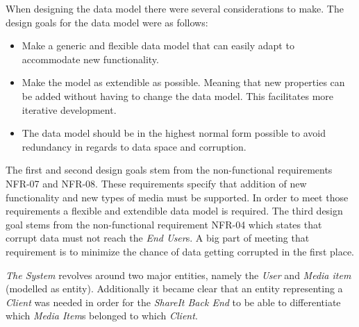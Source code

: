 \documentclass[../report.tex]{subfiles}
\begin{document}
\graphicspath{{img/}{../img/}}

When designing the data model there were several considerations to make. The design goals for the data model were as follows:
\begin{itemize}
\item Make a generic and flexible data model that can easily adapt to accommodate new functionality. 
\item Make the model as extendible as possible. Meaning that new properties can be added without having to change the data model. This facilitates more iterative development.
\item The data model should be in the highest normal form possible to avoid redundancy in regards to data space and corruption.
\end{itemize} 

The first and second design goals stem from the non-functional requirements NFR-07 and NFR-08. These requirements specify that addition of new functionality and new types of media must be supported. In order to meet those requirements a flexible and extendible data model is required.
The third design goal stems from the non-functional requirement NFR-04 which states that corrupt data must not reach the \textit{End User}s. A big part of meeting that requirement is to minimize the chance of data getting corrupted in the first place.





\textit{The System} revolves around two major entities, namely the \textit{User} and \textit{Media item} (modelled as entity). Additionally it became clear that an entity representing a \textit{Client} was needed in order for the \textit{ShareIt Back End} to be able to differentiate which \textit{Media Item}s belonged to which \textit{Client}. \\
\end{document}
